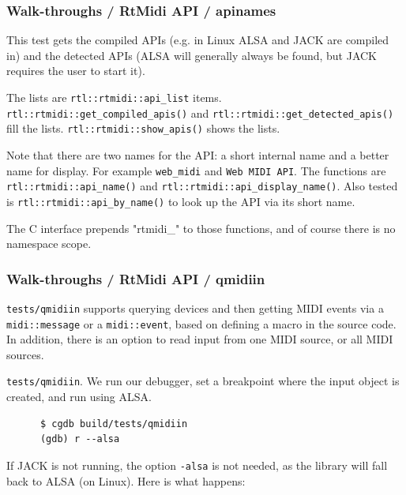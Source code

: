 \subsubsection{Walk-throughs / RtMidi API / apinames}
\label{sec:walkthroughs_rtmidi_api_apinames}

   This test gets the compiled APIs (e.g. in Linux ALSA and JACK are compiled
   in) and the detected APIs (ALSA will generally always be found, but
   JACK requires the user to start it).

   The lists are \texttt{rtl::rtmidi::api\_list} items.
   \texttt{rtl::rtmidi::get\_compiled\_apis()} and
   \texttt{rtl::rtmidi::get\_detected\_apis()} fill the lists.
   \texttt{rtl::rtmidi::show\_apis()} shows the lists.

   Note that there are two names for the API: a short internal name and
   a better name for display. For example
   \texttt{web\_midi} and \texttt{Web MIDI API}.
   The functions are
   \texttt{rtl::rtmidi::api\_name()} and
   \texttt{rtl::rtmidi::api\_display\_name()}.
   Also tested is \texttt{rtl::rtmidi::api\_by\_name()} to
   look up the API via its short name.

   The C interface prepends "rtmidi\_" to those functions,
   and of course there is no namespace scope.

\subsubsection{Walk-throughs / RtMidi API / qmidiin}
\label{sec:walkthroughs_rtmidi_api_qmidiin}

   \texttt{tests/qmidiin} supports querying devices and then getting MIDI
   events via a
   \texttt{midi::message} or a
   \texttt{midi::event}, based on defining a macro in the source
   code.
   In addition, there is an option to read input from one MIDI source,
   or all MIDI sources.


   \texttt{tests/qmidiin}.  We run our debugger, set a breakpoint
   where the input object is created, and run using ALSA.

   \begin{verbatim}
      $ cgdb build/tests/qmidiin
      (gdb) r --alsa
   \end{verbatim}

   If JACK is not running, the option \texttt{-\-alsa} is not needed,
   as the library will fall back to ALSA (on Linux).
   Here is what happens:

